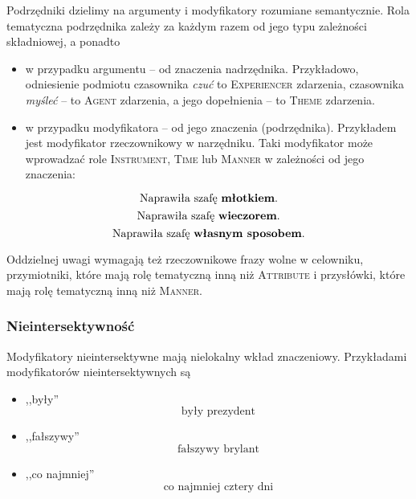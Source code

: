 \documentclass[12pt]{mwart}
\theoremstyle{remark}
\newcommand{\experiencer}{\textsc{Experiencer}}
\newcommand{\agent}{\textsc{Agent}}
\newcommand{\theme}{\textsc{Theme}}
\begin{document}
Podrzędniki dzielimy na argumenty i modyfikatory rozumiane semantycznie. Rola tematyczna podrzędnika zależy za każdym razem od 
jego typu zależności składniowej, a ponadto
\begin{itemize}
	\item w przypadku argumentu -- od znaczenia nadrzędnika.
Przykładowo, odniesienie podmiotu czasownika \emph{czuć} to \experiencer{} zdarzenia, czasownika \emph{myśleć} -- to \agent{} zdarzenia, a jego dopełnienia -- to \theme{} zdarzenia.
\item w przypadku modyfikatora -- od jego znaczenia (podrzędnika).
Przykładem jest modyfikator rzeczownikowy w narzędniku. Taki modyfikator może wprowadzać role \textsc{Instrument}, \textsc{Time} lub \textsc{Manner} w zależności od jego znaczenia:
\end{itemize}
\begin{equation}
	\text{Naprawiła szafę \textbf{młotkiem}.} 
\end{equation}
\begin{equation}
	\text{Naprawiła szafę \textbf{wieczorem}.} 
\end{equation}
\begin{equation}
	\text{Naprawiła szafę \textbf{własnym sposobem}.} 
\end{equation}

Oddzielnej uwagi wymagają też rzeczownikowe frazy wolne w celowniku,
przymiotniki, które mają rolę tematyczną inną niż \textsc{Attribute}
i przysłówki, które mają rolę tematyczną inną niż \textsc{Manner}.

\subsubsection{Nieintersektywność}

Modyfikatory nieintersektywne mają nielokalny wkład znaczeniowy. Przykładami modyfikatorów nieintersektywnych są
\begin{itemize}
\item ,,były''
\begin{equation}
	\text{były prezydent}
\end{equation}
\item ,,fałszywy''
\begin{equation}
	\text{fałszywy brylant}
\end{equation}
\item ,,co najmniej''
\begin{equation}
	\text{co najmniej cztery dni}
\end{equation}
\end{itemize}
\end{document}
